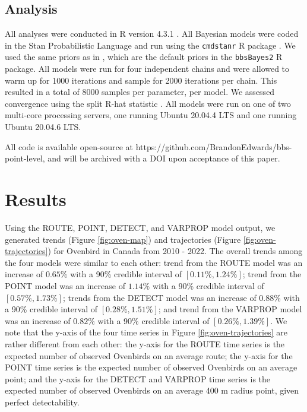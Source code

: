 \subsection{Analysis}
\par All analyses were conducted in R version 4.3.1 \citep{r_core_team_r_2024}.
All Bayesian models were coded in the Stan Probabilistic Language \citep{stan_development_team_stan_2024} and run using the \texttt{cmdstanr} R package \citep{gabry_cmdstanr_2023}.
We used the same priors as in \citet{smith_spatially_2023}, which are the default priors in the \texttt{bbsBayes2} R package.
All models were run for four independent chains and were allowed to warm up for 1000 iterations and sample for 2000 iterations per chain.
This resulted in a total of 8000 samples per parameter, per model.
We assessed convergence using the split R-hat statistic \citep{vehtari_rank-normalization_2021}.
All models were run on one of two multi-core processing servers, one running Ubuntu 20.04.4 LTS and one running Ubuntu 20.04.6 LTS.

\par All code is available open-source at https://github.com/BrandonEdwards/bbs-point-level, and will be archived with a DOI upon acceptance of this paper.

\section{Results}

\par Using the ROUTE, POINT, DETECT, and VARPROP model output, we generated trends (Figure \ref{fig:oven-map}) and trajectories (Figure \ref{fig:oven-trajectories}) for Ovenbird in Canada from 2010 - 2022.
The overall trends among the four models were similar to each other: trend from the ROUTE model was an increase of $0.65\%$ with a 90\% credible interval of $[0.11\%, 1.24\%]$; trend from the POINT model was an increase of $1.14\%$ with a 90\% credible interval of $[0.57\%, 1.73\%]$; trends from the DETECT model was an increase of $0.88\%$ with a 90\% credible interval of $[0.28\%, 1.51\%]$; and trend from the VARPROP model was an increase of $0.82\%$ with a 90\% credible interval of $[0.26\%, 1.39\%]$.
We note that the y-axis of the four time series in Figure \ref{fig:oven-trajectories} are rather different from each other: the y-axis for the ROUTE time series is the expected number of observed Ovenbirds on an average route; the y-axis for the POINT time series is the expected number of observed Ovenbirds on an average point; and the y-axis for the DETECT and VARPROP time series is the expected number of observed Ovenbirds on an average 400 m radius point, given perfect detectability.

